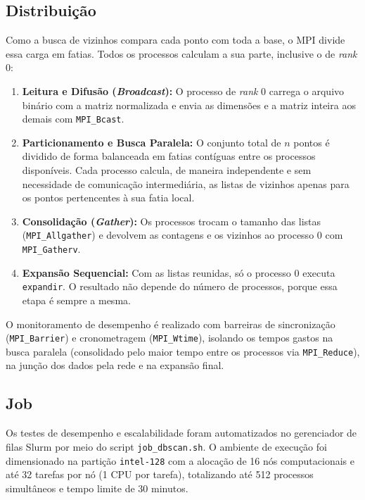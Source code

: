 \documentclass[a4paper,12pt]{article}
\begin{document}
\subsection{Distribuição}

Como a busca de vizinhos compara cada ponto com toda a base, o MPI divide essa
carga em fatias. Todos os processos calculam a sua parte, inclusive o de
\textit{rank} 0:

\begin{enumerate}
    \item \textbf{Leitura e Difusão (\textit{Broadcast}):} O processo de
          \textit{rank} 0 carrega o arquivo binário com a matriz normalizada e
          envia as dimensões e a matriz inteira aos demais com
          \texttt{MPI\_Bcast}. %
    \item \textbf{Particionamento e Busca Paralela:} O conjunto total de $n$
          pontos é dividido de forma balanceada em fatias contíguas entre os
          processos disponíveis. Cada processo calcula, de maneira independente
          e sem necessidade de comunicação intermediária, as listas de vizinhos
          apenas para os pontos pertencentes à sua fatia local.
    \item \textbf{Consolidação (\textit{Gather}):} Os processos trocam o tamanho
          das listas (\texttt{MPI\_Allgather}) e devolvem as contagens e os
          vizinhos ao processo 0 com \texttt{MPI\_Gatherv}.
    \item \textbf{Expansão Sequencial:} Com as listas reunidas, só o processo 0
          executa \texttt{expandir}. O resultado não depende do número de
          processos, porque essa etapa é sempre a mesma.
\end{enumerate}

O monitoramento de desempenho é realizado com barreiras de sincronização
(\texttt{MPI\_Barrier}) e cronometragem (\texttt{MPI\_Wtime}), isolando os
tempos gastos na busca paralela (consolidado pelo maior tempo entre os processos
via \texttt{MPI\_Reduce}), na junção dos dados pela rede e na expansão final.

\subsection{Job}
\label{subsec:job}

Os testes de desempenho e escalabilidade foram automatizados no gerenciador de
filas Slurm por meio do script \texttt{job\_dbscan.sh}. O ambiente de execução
foi dimensionado na partição \texttt{intel-128} com a alocação de 16 nós
computacionais e até 32 tarefas por nó (1 CPU por tarefa), totalizando até 512
processos simultâneos e tempo limite de 30 minutos.
\end{document}
